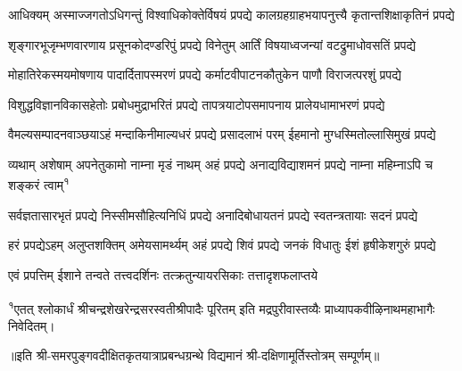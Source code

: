 

\twolineshloka
{आधिक्यम् अस्माज्जगतोऽधिगन्तुं विश्वाधिकोक्तेर्विषयं प्रपद्ये}
{कालग्रहग्राहभयापनुत्त्यै कृतान्तशिक्षाकृतिनं प्रपद्ये}

\twolineshloka
{शृङ्गारभूजृम्भणवारणाय प्रसूनकोदण्डरिपुं प्रपद्ये}
{विनेतुम् आर्तिं विषयाध्वजन्यां वटद्रुमाधोवसतिं प्रपद्ये}

\twolineshloka
{मोहातिरेकस्मयमोषणाय पादार्दितापस्मरणं प्रपद्ये}
{कर्माटवीपाटनकौतुकेन पाणौ विराजत्परशुं प्रपद्ये}

\twolineshloka
{विशुद्धविज्ञानविकासहेतोः प्रबोधमुद्राभरितं प्रपद्ये}
{तापत्रयाटोपसमापनाय प्रालेयधामाभरणं प्रपद्ये}

\twolineshloka
{वैमल्यसम्पादनवाञ्छयाऽहं मन्दाकिनीमाल्यधरं प्रपद्ये}
{प्रसादलाभं परम् ईहमानो मुग्धस्मितोल्लासिमुखं प्रपद्ये}

\twolineshloka
{व्यथाम् अशेषाम् अपनेतुकामो नाम्ना मृडं नाथम् अहं प्रपद्ये}
{अनाद्यविद्याशमनं प्रपद्ये नाम्ना महिम्नाऽपि च शङ्करं त्वाम्\textsuperscript{१}}

\twolineshloka
{सर्वज्ञतासारभृतं प्रपद्ये निस्सीमसौहित्यनिधिं प्रपद्ये}
{अनादिबोधायतनं प्रपद्ये स्वतन्त्रतायाः सदनं प्रपद्ये}

\twolineshloka
{हरं प्रपद्येऽहम् अलुप्तशक्तिम् अमेयसामर्थ्यम् अहं प्रपद्ये}
{शिवं प्रपद्ये जनकं विधातुः ईशं हृषीकेशगुरुं प्रपद्ये}

\twolineshloka
{एवं प्रपत्तिम् ईशाने तन्वते तत्त्वदर्शिनः}
{तत्क्रतुन्यायरसिकाः तत्तादृशफलाप्तये}

{\raggedright\fontsize{8}{9}\selectfont \textsuperscript{१}{एतत् श्लोकार्धं श्रीचन्द्रशेखरेन्द्रसरस्वतीश्रीपादैः पूरितम् इति मद्रपुरीवास्तव्यैः प्राध्यापकवीऴिनाथमहाभागैः निवेदितम्।}}


॥इति श्री-समरपुङ्गवदीक्षितकृतयात्राप्रबन्धग्रन्थे विद्यमानं श्री-दक्षिणामूर्तिस्तोत्रम् सम्पूर्णम्॥
